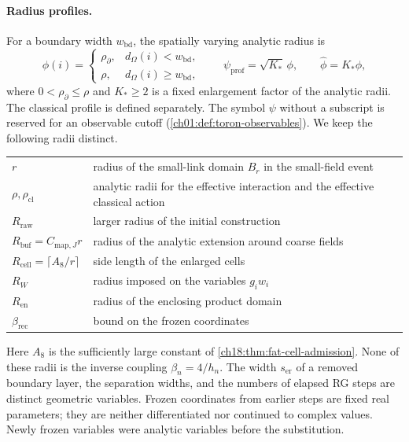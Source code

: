 \paragraph{Radius profiles.}
For a boundary width $w_{\mathrm{bd}}$, the spatially varying analytic radius is
\[
 \phi(i)=
 \begin{cases}\rho_\partial,&d_\Omega(i)<w_{\mathrm{bd}},\\
               \rho,&d_\Omega(i)\ge w_{\mathrm{bd}},\end{cases}
 \qquad \psi_{\mathrm{prof}}=\sqrt{K_*}\,\phi,
 \qquad\widehat\phi=K_*\phi,
\]
where $0<\rho_\partial\le\rho$ and $K_*\ge2$ is a fixed enlargement factor of the analytic radii. The classical profile is defined separately. The symbol $\psi$ without a subscript is reserved for an observable cutoff (\cref{ch01:def:toron-observables}). We keep the following radii distinct.
\begin{center}
\begin{tabular}{lp{}}
\toprule
$r$ & radius of the small-link domain $B_r$ in the small-field event\\
$\rho,\rho_{\mathrm{cl}}$ & analytic radii for the effective interaction and the effective classical action\\
$R_{\mathrm{raw}}$ & larger radius of the initial construction\\
$R_{\mathrm{buf}}=C_{\mathrm{map},J}r$ & radius of the analytic extension around coarse fields\\
$R_{\mathrm{cell}}=\lceil A_8/r\rceil$ & side length of the enlarged cells\\
$R_W$ & radius imposed on the variables $g_iw_i$\\
$R_{\mathrm{en}}$ & radius of the enclosing product domain\\
$\beta_{\mathrm{rec}}$ & bound on the frozen coordinates\\
\bottomrule
\end{tabular}
\end{center}
Here $A_8$ is the sufficiently large constant of \cref{ch18:thm:fat-cell-admission}. None of these radii is the inverse coupling $\beta_n=4/h_n$. The width $s_{\mathrm{er}}$ of a removed boundary layer, the separation widths, and the numbers of elapsed RG steps are distinct geometric variables. Frozen coordinates from earlier steps are fixed real parameters; they are neither differentiated nor continued to complex values. Newly frozen variables were analytic variables before the substitution.

